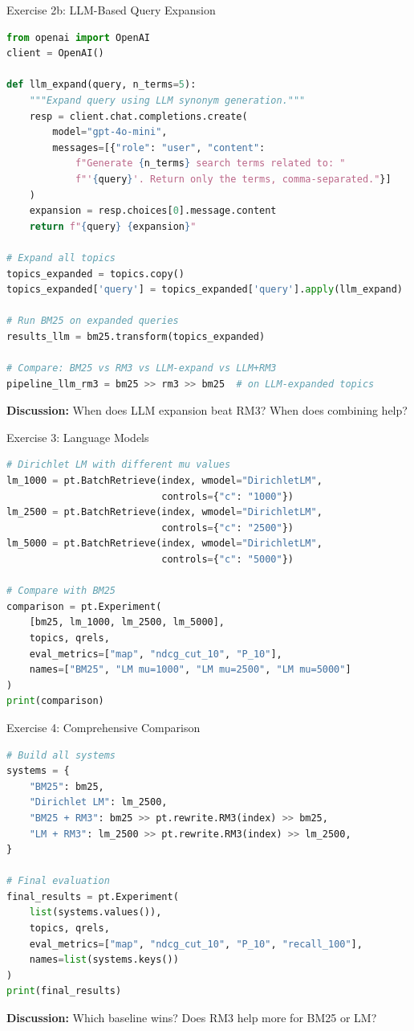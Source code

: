 \documentclass[aspectratio=169]{beamer}
\begin{document}
\begin{frame}[fragile,shrink=5]{Exercise 2b: LLM-Based Query Expansion}
\begin{lstlisting}[language=Python]
from openai import OpenAI
client = OpenAI()

def llm_expand(query, n_terms=5):
    """Expand query using LLM synonym generation."""
    resp = client.chat.completions.create(
        model="gpt-4o-mini",
        messages=[{"role": "user", "content": 
            f"Generate {n_terms} search terms related to: "
            f"'{query}'. Return only the terms, comma-separated."}]
    )
    expansion = resp.choices[0].message.content
    return f"{query} {expansion}"

# Expand all topics
topics_expanded = topics.copy()
topics_expanded['query'] = topics_expanded['query'].apply(llm_expand)

# Run BM25 on expanded queries
results_llm = bm25.transform(topics_expanded)

# Compare: BM25 vs RM3 vs LLM-expand vs LLM+RM3
pipeline_llm_rm3 = bm25 >> rm3 >> bm25  # on LLM-expanded topics
\end{lstlisting}

\textbf{Discussion:} When does LLM expansion beat RM3? When does combining help?
\end{frame}

\begin{frame}[fragile]{Exercise 3: Language Models}
\begin{lstlisting}[language=Python]
# Dirichlet LM with different mu values
lm_1000 = pt.BatchRetrieve(index, wmodel="DirichletLM", 
                           controls={"c": "1000"})
lm_2500 = pt.BatchRetrieve(index, wmodel="DirichletLM", 
                           controls={"c": "2500"})
lm_5000 = pt.BatchRetrieve(index, wmodel="DirichletLM", 
                           controls={"c": "5000"})

# Compare with BM25
comparison = pt.Experiment(
    [bm25, lm_1000, lm_2500, lm_5000],
    topics, qrels,
    eval_metrics=["map", "ndcg_cut_10", "P_10"],
    names=["BM25", "LM mu=1000", "LM mu=2500", "LM mu=5000"]
)
print(comparison)
\end{lstlisting}
\end{frame}

\begin{frame}[fragile]{Exercise 4: Comprehensive Comparison}
\begin{lstlisting}[language=Python]
# Build all systems
systems = {
    "BM25": bm25,
    "Dirichlet LM": lm_2500,
    "BM25 + RM3": bm25 >> pt.rewrite.RM3(index) >> bm25,
    "LM + RM3": lm_2500 >> pt.rewrite.RM3(index) >> lm_2500,
}

# Final evaluation
final_results = pt.Experiment(
    list(systems.values()),
    topics, qrels,
    eval_metrics=["map", "ndcg_cut_10", "P_10", "recall_100"],
    names=list(systems.keys())
)
print(final_results)
\end{lstlisting}

\textbf{Discussion:} Which baseline wins? Does RM3 help more for BM25 or LM?
\end{frame}
\end{document}
